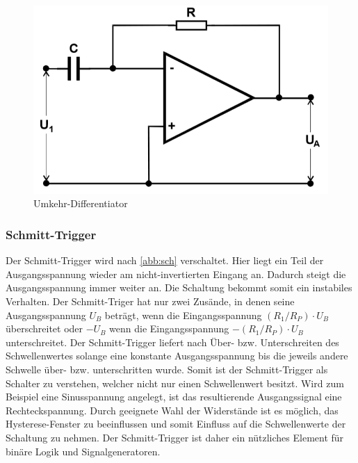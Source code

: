\begin{figure}[h!]
 	\centering
 	\includegraphics[width=\textwidth]{img/diff.png}
 	\caption{Umkehr-Differentiator \cite{FP}}
 	\label{abb:diff}
\end{figure}


\subsubsection{Schmitt-Trigger}
Der Schmitt-Trigger wird nach \autoref{abb:sch} verschaltet. Hier liegt ein Teil der Ausgangsspannung wieder am  nicht-invertierten Eingang an. Dadurch steigt die Ausgangsspannung immer weiter an. Die Schaltung bekommt somit ein instabiles Verhalten. Der Schmitt-Triger hat nur zwei Zusände, in denen seine Ausgangsspannung $U_B$ beträgt, wenn die Eingangsspannung $(R_1 / R_P) \cdot U_B$ überschreitet oder
$-U_B$ wenn die Eingangsspannung $-(R_1 / R_P) \cdot U_B$ unterschreitet. Der Schmitt-Trigger liefert nach Über- bzw. Unterschreiten des Schwellenwertes solange eine konstante Ausgangsspannung bis die jeweils andere Schwelle über- bzw. unterschritten wurde. Somit ist der Schmitt-Trigger als Schalter zu verstehen, welcher nicht nur einen Schwellenwert besitzt. Wird zum Beispiel eine Sinusspannung angelegt, ist das resultierende Ausgangssignal eine Rechteckspannung. Durch geeignete Wahl der Widerstände ist es möglich, das Hysterese-Fenster zu beeinflussen und somit Einfluss auf die Schwellenwerte der Schaltung zu nehmen. Der Schmitt-Trigger ist daher ein nützliches Element für binäre Logik und Signalgeneratoren.

